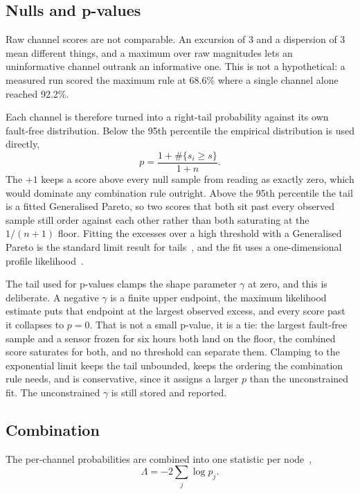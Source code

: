 \documentclass{article}
\begin{document}
\subsection{Nulls and p-values}
\label{sec:nulls}

Raw channel scores are not comparable. An excursion of 3 and a dispersion of 3
mean different things, and a maximum over raw magnitudes lets an uninformative
channel outrank an informative one. This is not a hypothetical: a measured run
scored the maximum rule at 68.6\% where a single channel alone reached 92.2\%.

Each channel is therefore turned into a right-tail probability against its own
fault-free distribution. Below the 95th percentile the empirical distribution
is used directly,
\begin{equation}
  p = \frac{1 + \#\{s_{i} \ge s\}}{1 + n} .
\end{equation}
The $+1$ keeps a score above every null sample from reading as exactly zero,
which would dominate any combination rule outright. Above the 95th percentile
the tail is a fitted Generalised Pareto, so two scores that both sit past every
observed sample still order against each other rather than both saturating at
the $1/(n+1)$ floor. Fitting the excesses over a high threshold with a
Generalised Pareto is the standard limit result for
tails~\citep{pickands1975gpd}, and the fit uses a one-dimensional profile
likelihood~\citep{grimshaw1993gpd}.

The tail used for p-values clamps the shape parameter $\gamma$ at zero, and
this is deliberate. A negative $\gamma$ is a finite upper endpoint, the maximum
likelihood estimate puts that endpoint at the largest observed excess, and every
score past it collapses to $p = 0$. That is not a small p-value, it is a tie:
the largest fault-free sample and a sensor frozen for six hours both land on the
floor, the combined score saturates for both, and no threshold can separate
them. Clamping to the exponential limit keeps the tail unbounded, keeps the
ordering the combination rule needs, and is conservative, since it assigns a
larger $p$ than the unconstrained fit. The unconstrained $\gamma$ is still
stored and reported.

\subsection{Combination}
\label{sec:combine}

The per-channel probabilities are combined into one statistic per
node~\citep{fisher1925methods},
\begin{equation}
  \Lambda = -2 \sum_{j} \log p_{j} .
\end{equation}
\end{document}
